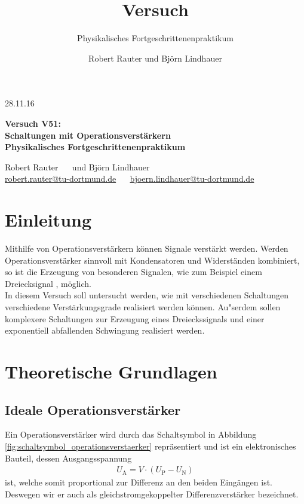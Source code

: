 \documentclass[]{scrartcl}
\title{Versuch \versuchnummer\\ \versuchname}
\subtitle{Physikalisches Fortgeschrittenenpraktikum}
\author{Robert Rauter und Björn Lindhauer}
\date{\versuchdatum}
\newcommand{\versuchnummer}{V51}
\newcommand{\versuchname}{Schaltungen mit Operationsverstärkern}
\newcommand{\versuchdatum}{28.11.16}
\let\oldsection\section
\renewcommand\section{\clearpage\oldsection}
\begin{document}
\begin{titlepage}
{\large \versuchdatum}
\vspace{7cm}
\begin{center}
\textbf{\huge Versuch \versuchnummer:}\\
\vspace{0.5cm}
\textbf{\huge \versuchname}\\
\vspace{0.2cm}
\textbf{ Physikalisches Fortgeschrittenenpraktikum}\\
\vspace{9cm}

{\Large Robert Rauter \ \ \hspace{1.5cm} und \hspace{1.5cm} Björn Lindhauer}\\
{ \url{robert.rauter@tu-dortmund.de} \ \ \hspace{2cm} \url{bjoern.lindhauer@tu-dortmund.de}}
\end{center}
\end{titlepage}

\tableofcontents

\section{Einleitung}
Mithilfe von Operationsverstärkern können Signale verstärkt werden. Werden Operationsverstärker sinnvoll mit Kondensatoren und Widerständen kombiniert, so ist die Erzeugung von besonderen Signalen, wie zum Beispiel einem Dreiecksignal , möglich. \\
In diesem Versuch soll untersucht werden, wie mit verschiedenen Schaltungen verschiedene Verstärkungsgrade realisiert werden können. Au"serdem sollen komplexere Schaltungen zur Erzeugung eines Dreieckssignals und einer exponentiell abfallenden Schwingung realisiert werden.

\section{Theoretische Grundlagen}
\subsection{Ideale Operationsverstärker}
Ein Operationsverstärker wird durch das Schaltsymbol in Abbildung  \ref{fig:schaltsymbol_operationsverstaerker} repräsentiert und ist ein elektronisches Bauteil, dessen Ausgangsspannung
\begin{align}
 U_{\text{A}}=V\cdot \left( U_{\text{P}}-U_{\text{N}} \right)
\end{align}
ist, welche somit proportional zur Differenz an den beiden Eingängen ist.
Deswegen wir er auch als gleichstromgekoppelter Differenzverstärker bezeichnet.
\end{document}
